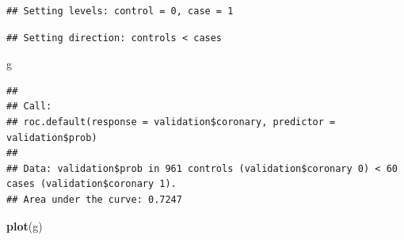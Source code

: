 \documentclass[
]{article}
\newenvironment{Shaded}{\begin{snugshade}}{\end{snugshade}}
\newcommand{\AttributeTok}[1]{\textcolor[rgb]{0.13,0.29,0.53}{#1}}
\newcommand{\CommentTok}[1]{\textcolor[rgb]{0.56,0.35,0.01}{\textit{#1}}}
\newcommand{\FunctionTok}[1]{\textcolor[rgb]{0.13,0.29,0.53}{\textbf{#1}}}
\newcommand{\NormalTok}[1]{#1}
\newcommand{\OtherTok}[1]{\textcolor[rgb]{0.56,0.35,0.01}{#1}}
\newcommand{\SpecialCharTok}[1]{\textcolor[rgb]{0.81,0.36,0.00}{\textbf{#1}}}
\newcommand{\StringTok}[1]{\textcolor[rgb]{0.31,0.60,0.02}{#1}}
\begin{document}
\begin{Shaded}
\end{Shaded}

\begin{verbatim}
## Setting levels: control = 0, case = 1
\end{verbatim}

\begin{verbatim}
## Setting direction: controls < cases
\end{verbatim}

\begin{Shaded}
\begin{Highlighting}[]
\NormalTok{g}
\end{Highlighting}
\end{Shaded}

\begin{verbatim}
## 
## Call:
## roc.default(response = validation$coronary, predictor = validation$prob)
## 
## Data: validation$prob in 961 controls (validation$coronary 0) < 60 cases (validation$coronary 1).
## Area under the curve: 0.7247
\end{verbatim}

\begin{Shaded}
\begin{Highlighting}[]
\FunctionTok{plot}\NormalTok{(g)}
\end{Highlighting}
\end{Shaded}
\end{document}
